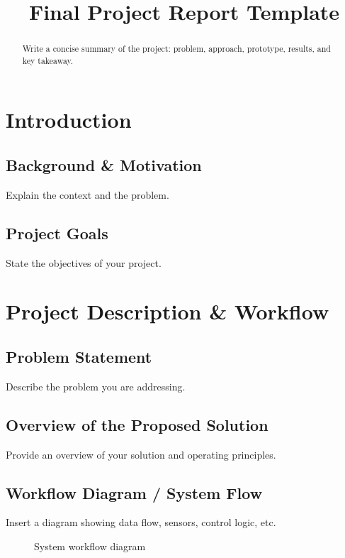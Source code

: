 \documentclass[12pt]{article}
\title{Final Project Report Template}
\author{}
\date{}
\begin{document}
\maketitle

\begin{abstract}
Write a concise summary of the project: problem, approach, prototype, results, and key takeaway.
\end{abstract}

\tableofcontents
\newpage

\section{Introduction}

\subsection{Background \& Motivation}
Explain the context and the problem.

\subsection{Project Goals}
State the objectives of your project.

\section{Project Description \& Workflow}

\subsection{Problem Statement}
Describe the problem you are addressing.

\subsection{Overview of the Proposed Solution}
Provide an overview of your solution and operating principles.

\subsection{Workflow Diagram / System Flow}
Insert a diagram showing data flow, sensors, control logic, etc.

\begin{figure}[H]
\centering
\caption{System workflow diagram}
\end{figure}
\end{document}
